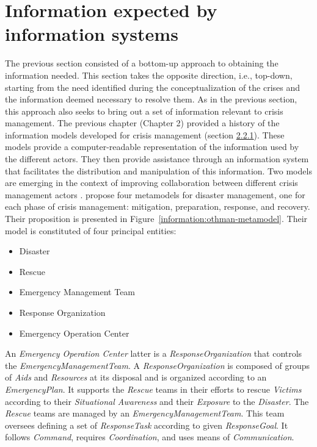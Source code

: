 \section{Information expected by information systems}
\label{sec:crisismetamodel}
The previous section consisted of a bottom-up approach to obtaining the information needed.
This section takes the opposite direction, i.e., top-down, starting from the need identified during the conceptualization of the crises and the information deemed necessary to resolve them.
As in the previous section, this approach also seeks to bring out a set of information relevant to crisis management.
The previous chapter (Chapter 2) provided a history of the information models developed for crisis management (section \hyperref[sec:lit-information-models]{2.2.1}).
These models provide a computer-readable representation of the information used by the different actors.
They then provide assistance through an information system that facilitates the distribution and manipulation of this information.
Two models are emerging in the context of improving collaboration between different crisis management actors \parencite{othmanDevelopmentValidationDisaster2014,benabenMetamodelItsOntology2008}.
\textcite{othmanDevelopmentValidationDisaster2014} propose four metamodels for disaster management, one for each phase of crisis management: mitigation, preparation, response, and recovery.
Their proposition is presented in Figure~\ref{information:othman-metamodel}.
Their model is constituted of four principal entities:

\begin{itemize}
    \item Disaster
    \item Rescue
    \item Emergency Management Team
    \item Response Organization
    \item Emergency Operation Center
\end{itemize}

An \textit{Emergency Operation Center} latter is a \textit{ResponseOrganization} that controls the \textit{EmergencyManagementTeam}.
A \textit{ResponseOrganization} is composed of groups of \textit{Aids} and \textit{Resources} at its disposal and is organized according to an \textit{EmergencyPlan}.
It supports the \textit{Rescue} teams in their efforts to rescue \textit{Victims} according to their \textit{Situational Awareness} and their \textit{Exposure} to the \textit{Disaster}.
The \textit{Rescue} teams are managed by an \textit{EmergencyManagementTeam}.
This team oversees defining a set of \textit{ResponseTask} according to given \textit{ResponseGoal}.
It follows \textit{Command}, requires \textit{Coordination}, and uses means of \textit{Communication}.

